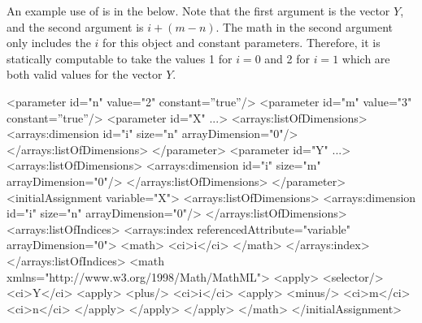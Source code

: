 An example use of  is in the \InitialAssignment below.  Note that the first argument is the vector $Y$, and the second argument is $i + (m-n)$.  The math in the second argument only includes the \Dimension {} $i$ for this object and constant parameters.  Therefore, it is statically computable to take the values 1 for $i=0$ and 2 for $i=1$ which are both valid values for the vector $Y$.
\begin{example}
<parameter id="n" value="2" constant=''true''/>
<parameter id="m" value="3" constant=''true''/>
<parameter id="X" ...>
  <arrays:listOfDimensions>
    <arrays:dimension id="i" size="n" arrayDimension="0"/>
  </arrays:listOfDimensions>
</parameter>
<parameter id="Y" ...>
  <arrays:listOfDimensions>
    <arrays:dimension id="i" size="m" arrayDimension="0"/>
  </arrays:listOfDimensions>
</parameter>
<initialAssignment variable="X"> 
  <arrays:listOfDimensions>
    <arrays:dimension id="i" size="n" arrayDimension="0"/>
  </arrays:listOfDimensions>
  <arrays:listOfIndices>
    <arrays:index referencedAttribute="variable" arrayDimension="0">
      <math>
        <ci>i</ci>
      </math>
    </arrays:index>
  </arrays:listOfIndices>
  <math xmlns="http://www.w3.org/1998/Math/MathML">
    <apply>
      <selector/> 
        <ci>Y</ci> 
        <apply>
          <plus/>
            <ci>i</ci>
            <apply>
              <minus/>
                <ci>m</ci>
                <ci>n</ci>
            </apply>
        </apply>
    </apply>
  </math>
</initialAssignment>
\end{example}
